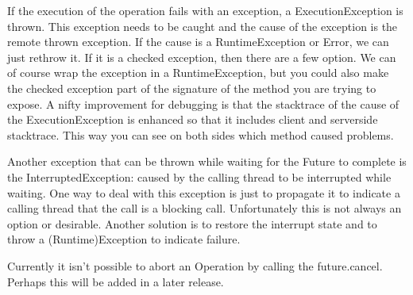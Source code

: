 If the execution of the operation fails with an exception, a ExecutionException is thrown. This exception needs to be caught and the cause of the exception is the remote thrown exception. If the cause is a RuntimeException or Error, we can just rethrow it. If it is a checked exception, then there are a few option. We can of course wrap the exception in a RuntimeException, but you could also make the checked exception part of the signature of the method you are trying to expose. A nifty improvement for debugging is that the stacktrace of the cause of the ExecutionException is enhanced so that it includes client and serverside stacktrace. This way you can see on both sides which method caused problems.

Another exception that can be thrown while waiting for the Future to complete is the InterruptedException: caused by the calling thread to be interrupted while waiting. One way to deal with this exception is just to propagate it to indicate a calling thread that the call is a blocking call. Unfortunately this is not always an option or desirable. Another solution is to restore the interrupt state and to throw a (Runtime)Exception to indicate failure. 

Currently it isn't possible to abort an Operation by calling the future.cancel. Perhaps this will be added in a later release.

